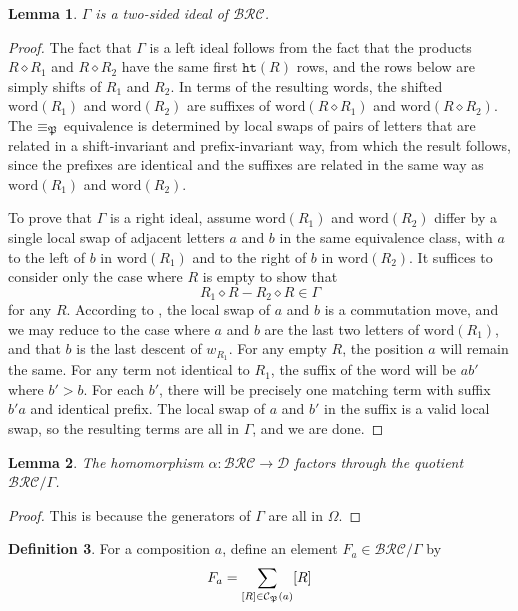 \documentclass{amsart}
\newtheorem{lemma}{Lemma}[subsection]
\theoremstyle{definition}
\newtheorem{definition}[lemma]{Definition}
\theoremstyle{remark}
\numberwithin{equation}{subsection}
\newcommand{\wof}[1]{w_{#1}}
\newcommand{\hr}{\mathtt{ht}}
\newcommand{\BRC}{\mathcal{BRC}}
\newcommand{\dcoma}{\mathcal{D}}
\begin{document}
\begin{lemma} \label{lemma:forestideal}
  $\Gamma$ is a two-sided ideal of $\BRC$.
\end{lemma}
\begin{proof}
  The fact that $\Gamma$ is a left ideal follows from the fact that the products $R\diamond R_1$ and $R\diamond R_2$ have the same first $\hr(R)$ rows, and the rows below are simply shifts of $R_1$ and $R_2$. In terms of the resulting words, the shifted $\mathrm{word}(R_1)$ and $\mathrm{word}(R_2)$ are suffixes of $\mathrm{word}(R\diamond R_1)$ and $\mathrm{word}(R\diamond R_2)$. The $\equiv_{\mathfrak{P}}$ equivalence is determined by local swaps of pairs of letters that are related in a shift-invariant \cite[Proposition~5.8]{nadeau2024forest} and prefix-invariant \cite[Lemma~5.9]{nadeau2024forest} way, from which the result follows, since the prefixes are identical and the suffixes are related in the same way as $\mathrm{word}(R_1)$ and $\mathrm{word}(R_2)$.

  To prove that $\Gamma$ is a right ideal, assume $\mathrm{word}(R_1)$ and $\mathrm{word}(R_2)$ differ by a single local swap of adjacent letters $a$ and $b$ in the same equivalence class, with $a$ to the left of $b$ in $\mathrm{word}(R_1)$ and to the right of $b$ in $\mathrm{word}(R_2)$. It suffices to consider only the case where $R$ is empty to show that
  $$R_1\diamond R - R_2\diamond R\in \Gamma$$
  for any $R$. According to \cite{nadeau2024forest}, the local swap of $a$ and $b$ is a commutation move, and we may reduce to the case where $a$ and $b$ are the last two letters of $\mathrm{word}(R_1)$, and that $b$ is the last descent of $\wof{R_1}$. For any empty $R$, the position $a$ will remain the same. For any term not identical to $R_1$, the suffix of the word will be $ab'$ where $b'>b$. For each $b'$, there will be precisely one matching term with suffix $b'a$ and identical prefix. The local swap of $a$ and $b'$ in the suffix is a valid local swap, so the resulting terms are all in $\Gamma$, and we are done.
\end{proof}

\begin{lemma}
  The homomorphism $\alpha:\BRC\to\dcoma$ factors through the quotient $\BRC/\Gamma$.
\end{lemma}
\begin{proof}
This is because the generators of $\Gamma$ are all in $\Omega$.
\end{proof}

\begin{definition}
For a composition $a$, define  an element $F_a\in\BRC/\Gamma$ by
$$F_a =\sum_{[R]\in\mathcal{C}_{\mathfrak{P}}(a)} [R]$$
\end{definition}
\end{document}
